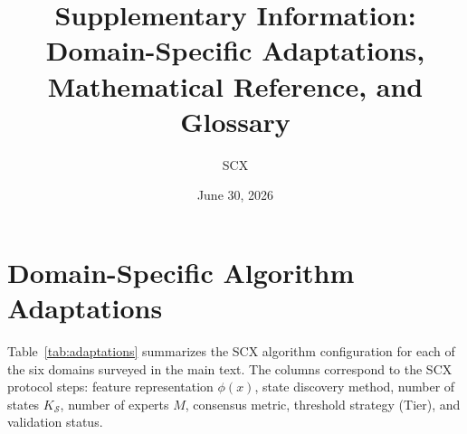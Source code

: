 \documentclass{article}
\begin{document}
\title{Supplementary Information: \\ Domain-Specific Adaptations, Mathematical Reference, and Glossary}

\author{SCX}
\date{June 30, 2026}

\maketitle

\tableofcontents

\newpage

\section{Domain-Specific Algorithm Adaptations}
\label{sec:adaptations}

Table~\ref{tab:adaptations} summarizes the SCX algorithm configuration for each of the six domains surveyed in the main text. The columns correspond to the SCX protocol steps: feature representation $\phi(x)$, state discovery method, number of states $K_{\mathcal{S}}$, number of experts $M$, consensus metric, threshold strategy (Tier), and validation status.
\end{document}
